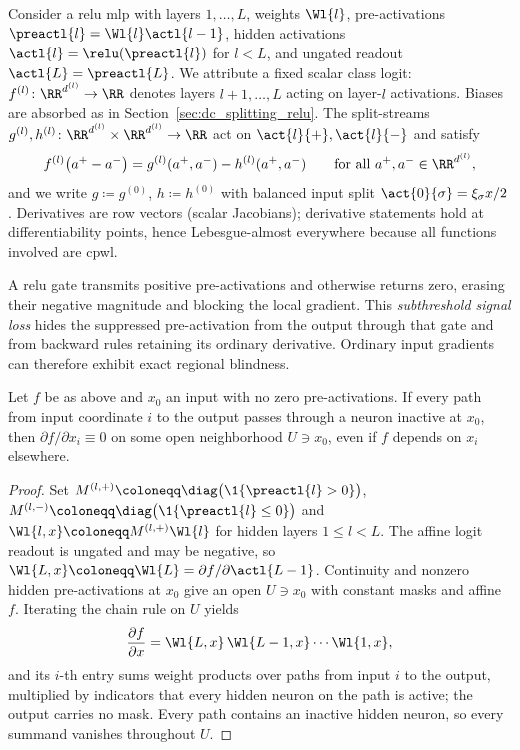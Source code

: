 Consider a \ac{relu} \ac{mlp} with layers $1,\dots,L$, weights $\Wl{l}$, pre-activations $\preactl{l}=\Wl{l}\actl{l-1}$, hidden activations $\actl{l}=\relu(\preactl{l})$ for $l<L$, and ungated readout $\actl{L}=\preactl{L}$. We attribute a fixed scalar class logit: $f^{(l)}\colon\RR^{d^{(l)}}\to\RR$ denotes layers $l+1,\dots,L$ acting on layer-$l$ activations. Biases are absorbed as in Section~\ref{sec:dc_splitting_relu}. The split-streams $g^{(l)},h^{(l)}\colon\RR^{d^{(l)}}\times\RR^{d^{(l)}}\to\RR$ act on $\act{l}{+},\act{l}{-}$ and satisfy
\begin{equation}
	f^{(l)}\bigl(a^{+} - a^{-}\bigr) = g^{(l)}(a^{+}, a^{-}) - h^{(l)}(a^{+}, a^{-})
	\qquad \text{for all } a^{+}, a^{-} \in \RR^{d^{(l)}},
	\label{eq:split_correctness_recall}
\end{equation}
and we write $g\coloneqq g^{(0)}$, $h\coloneqq h^{(0)}$ with balanced input split $\act{0}{\sigma}=\xi_\sigma x/2$. Derivatives are row vectors (scalar Jacobians); derivative statements hold at differentiability points, hence Lebesgue-almost everywhere because all functions involved are \ac{cpwl}.

A \ac{relu} gate transmits positive pre-activations and otherwise returns zero, erasing their negative magnitude and blocking the local gradient. This \emph{subthreshold signal loss} hides the suppressed pre-activation from the output through that gate and from backward rules retaining its ordinary derivative. Ordinary input gradients can therefore exhibit exact regional blindness.

\begin{proposition}\label{prop:gradient_blindness}
Let $f$ be as above and $x_0$ an input with no zero pre-activations. If every path from input coordinate $i$ to the output passes through a neuron inactive at $x_0$, then $\partial f/\partial x_i\equiv0$ on some open neighborhood $U\ni x_0$, even if $f$ depends on $x_i$ elsewhere.\end{proposition}

\begin{proof}
Set $M^{(l,+)}\coloneqq\diag\bigl(\1\{\preactl{l}>0\}\bigr)$, $M^{(l,-)}\coloneqq\diag\bigl(\1\{\preactl{l}\leq0\}\bigr)$ and $\Wl{l,x}\coloneqq M^{(l,+)}\Wl{l}$ for hidden layers $1\leq l<L$. The affine logit readout is ungated and may be negative, so $\Wl{L,x}\coloneqq\Wl{L}=\partial f/\partial\actl{L-1}$. Continuity and nonzero hidden pre-activations at $x_0$ give an open $U\ni x_0$ with constant masks and affine $f$. Iterating the chain rule on $U$ yields
\begin{equation}
	\frac{\partial f}{\partial x}
	= \Wl{L,x} \, \Wl{L-1,x} \cdots \Wl{1,x},
	\label{eq:masked_path_product}
\end{equation}
and its $i$-th entry sums weight products over paths from input $i$ to the output, multiplied by indicators that every hidden neuron on the path is active; the output carries no mask. Every path contains an inactive hidden neuron, so every summand vanishes throughout $U$.
\end{proof}

